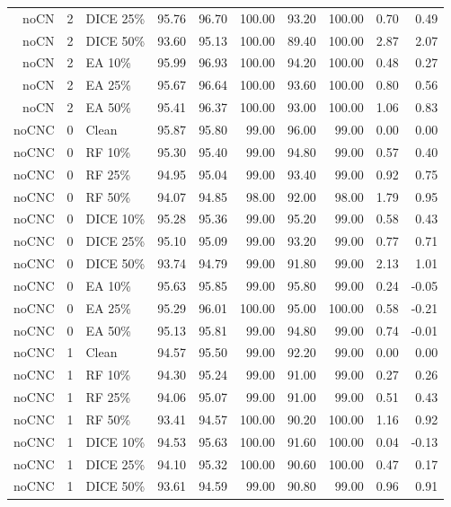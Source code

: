 {\begin{longtable}{rllrrrrrrr}
noCN & 2 & DICE 25\% & 95.76 & 96.70 & 100.00 & 93.20 & 100.00 & 0.70 & 0.49 \\
noCN & 2 & DICE 50\% & 93.60 & 95.13 & 100.00 & 89.40 & 100.00 & 2.87 & 2.07 \\
noCN & 2 & EA 10\% & 95.99 & 96.93 & 100.00 & 94.20 & 100.00 & 0.48 & 0.27 \\
noCN & 2 & EA 25\% & 95.67 & 96.64 & 100.00 & 93.60 & 100.00 & 0.80 & 0.56 \\
noCN & 2 & EA 50\% & 95.41 & 96.37 & 100.00 & 93.00 & 100.00 & 1.06 & 0.83 \\
noCNC & 0 & Clean & 95.87 & 95.80 & 99.00 & 96.00 & 99.00 & 0.00 & 0.00 \\
noCNC & 0 & RF 10\% & 95.30 & 95.40 & 99.00 & 94.80 & 99.00 & 0.57 & 0.40 \\
noCNC & 0 & RF 25\% & 94.95 & 95.04 & 99.00 & 93.40 & 99.00 & 0.92 & 0.75 \\
noCNC & 0 & RF 50\% & 94.07 & 94.85 & 98.00 & 92.00 & 98.00 & 1.79 & 0.95 \\
noCNC & 0 & DICE 10\% & 95.28 & 95.36 & 99.00 & 95.20 & 99.00 & 0.58 & 0.43 \\
noCNC & 0 & DICE 25\% & 95.10 & 95.09 & 99.00 & 93.20 & 99.00 & 0.77 & 0.71 \\
noCNC & 0 & DICE 50\% & 93.74 & 94.79 & 99.00 & 91.80 & 99.00 & 2.13 & 1.01 \\
noCNC & 0 & EA 10\% & 95.63 & 95.85 & 99.00 & 95.80 & 99.00 & 0.24 & -0.05 \\
noCNC & 0 & EA 25\% & 95.29 & 96.01 & 100.00 & 95.00 & 100.00 & 0.58 & -0.21 \\
noCNC & 0 & EA 50\% & 95.13 & 95.81 & 99.00 & 94.80 & 99.00 & 0.74 & -0.01 \\
noCNC & 1 & Clean & 94.57 & 95.50 & 99.00 & 92.20 & 99.00 & 0.00 & 0.00 \\
noCNC & 1 & RF 10\% & 94.30 & 95.24 & 99.00 & 91.00 & 99.00 & 0.27 & 0.26 \\
noCNC & 1 & RF 25\% & 94.06 & 95.07 & 99.00 & 91.00 & 99.00 & 0.51 & 0.43 \\
noCNC & 1 & RF 50\% & 93.41 & 94.57 & 100.00 & 90.20 & 100.00 & 1.16 & 0.92 \\
noCNC & 1 & DICE 10\% & 94.53 & 95.63 & 100.00 & 91.60 & 100.00 & 0.04 & -0.13 \\
noCNC & 1 & DICE 25\% & 94.10 & 95.32 & 100.00 & 90.60 & 100.00 & 0.47 & 0.17 \\
noCNC & 1 & DICE 50\% & 93.61 & 94.59 & 99.00 & 90.80 & 99.00 & 0.96 & 0.91 \\

\end{longtable}}
